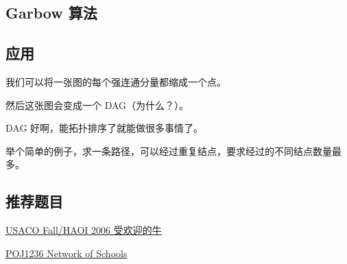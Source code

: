 \subsection{Garbow 算法}

\subsection{应用}

我们可以将一张图的每个强连通分量都缩成一个点。

然后这张图会变成一个 DAG（为什么？）。

DAG 好啊，能拓扑排序了就能做很多事情了。

举个简单的例子，求一条路径，可以经过重复结点，要求经过的不同结点数量最多。

\subsection{推荐题目}

\href{https://www.lydsy.com/JudgeOnline/problem.php?id=1051}{USACO Fall/HAOI 2006 受欢迎的牛}

\href{http://poj.org/problem?id=1236}{POJ1236 Network of Schools}
